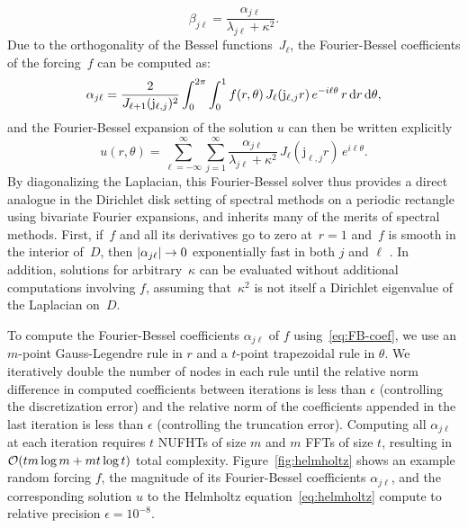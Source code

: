 \begin{equation}
  \beta_{j\ell} 
  = \frac{\alpha_{j\ell}}{\lambda_{j\ell} + \kappa^2}.
\end{equation}
Due to the orthogonality of the Bessel functions~$J_\ell$, the Fourier-Bessel
coefficients of the forcing~$f$ can be computed as:
\begin{equation} \label{eq:FB-coef}
  \alpha_{j\ell} 
  = \frac{2}{J_{\ell+1}(\mathrm{j}_{\ell,j})^2} \int_0^{2\pi} \int_0^1
  f(r,\theta) \, J_\ell(\mathrm{j}_{\ell,j}r) \, e^{-i\ell\theta} \, r \dif{r} \dif{\theta},
\end{equation}
and the Fourier-Bessel expansion of the solution $u$ can then be written
explicitly
\begin{equation}
  u(r,\theta) = \sum_{\ell=-\infty}^\infty \sum_{j=1}^\infty
  \frac{\alpha_{j\ell}}{\lambda_{j\ell} + \kappa^2} \,
  J_\ell(\mathrm{j}_{\ell,j}r) \, e^{i\ell\theta}.
\end{equation}
By diagonalizing the Laplacian, this Fourier-Bessel solver thus provides a
direct analogue in the Dirichlet disk setting of spectral methods on a periodic
rectangle using bivariate Fourier expansions, and inherits many of the merits of
spectral methods. First, if~$f$ and all its derivatives go to zero at~$r=1$
and~$f$ is smooth in the interior of~$D$, then $\left|\alpha_{j\ell}\right| \to 0$
exponentially fast in both $j$ and $\ell$ \cite{boyd2011comparing}. In addition,
solutions for arbitrary~$\kappa$ can be evaluated without additional
computations involving $f$, assuming that~$\kappa^2$ is not itself a Dirichlet
eigenvalue of the Laplacian on~$D$.

To compute the Fourier-Bessel coefficients $\alpha_{j\ell}$ of $f$
using~\eqref{eq:FB-coef}, we use an $m$-point Gauss-Legendre rule in $r$ and a
$t$-point trapezoidal rule in $\theta$. We iteratively double the number of
nodes in each rule until the relative norm difference in computed coefficients
between iterations is less than $\epsilon$ (controlling the discretization
error) and the relative norm of the coefficients appended in the last iteration
is less than $\epsilon$ (controlling the truncation error). Computing all
$\alpha_{j\ell}$ at each iteration requires $t$ NUFHTs of size $m$ and $m$ FFTs
of size $t$, resulting in $\mathcal{O}(tm\log m + mt\log t)$ total complexity.
Figure~\ref{fig:helmholtz} shows an example random forcing $f$, the magnitude of
its Fourier-Bessel coefficients $\alpha_{j\ell}$, and the corresponding solution
$u$ to the Helmholtz equation~\eqref{eq:helmholtz} compute to relative precision
$\epsilon = 10^{-8}$.


